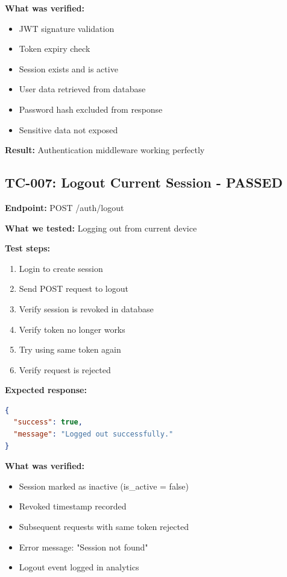 \documentclass[11pt,a4paper]{article}
\begin{document}
\textbf{What was verified:}
\begin{itemize}
    \item JWT signature validation
    \item Token expiry check
    \item Session exists and is active
    \item User data retrieved from database
    \item Password hash excluded from response
    \item Sensitive data not exposed
\end{itemize}

\textbf{Result:} Authentication middleware working perfectly

\subsection{TC-007: Logout Current Session - PASSED}
\textbf{Endpoint:} POST /auth/logout

\textbf{What we tested:} Logging out from current device

\textbf{Test steps:}
\begin{enumerate}
    \item Login to create session
    \item Send POST request to logout
    \item Verify session is revoked in database
    \item Verify token no longer works
    \item Try using same token again
    \item Verify request is rejected
\end{enumerate}

\textbf{Expected response:}
\begin{lstlisting}[language=json]
{
  "success": true,
  "message": "Logged out successfully."
}
\end{lstlisting}

\textbf{What was verified:}
\begin{itemize}
    \item Session marked as inactive (is\_active = false)
    \item Revoked timestamp recorded
    \item Subsequent requests with same token rejected
    \item Error message: "Session not found"
    \item Logout event logged in analytics
\end{itemize}
\end{document}
